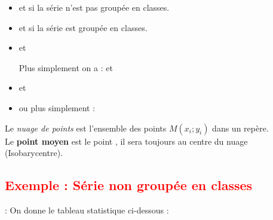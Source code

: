 \documentclass[12pt,a4paper]{article}
\begin{document}
\vspace{0.3cm}

\begin{itemize}
    \item 
    \quad et \quad 
    \quad si la série n’est pas groupée en classes.

    \item 
    \quad et \quad 
    \quad si la série est groupée en classes.

    \item 
    \quad et \quad 

     Plus simplement on a :
    \quad et \quad 

    \item 
    \quad et \quad 

    \item 
    \quad ou plus simplement :
\end{itemize}

\vspace{0.3cm}
Le \textit{nuage de points} est l’ensemble des points \( M(x_i ; y_i) \) dans un repère.\\
Le \textbf{point moyen} est le point 
, 
il sera toujours au centre du nuage (Isobarycentre).

\noindent
\subsection*{\textcolor{red}{Exemple : Série non groupée en classes}} : On donne le tableau statistique ci-dessous :
\end{document}
